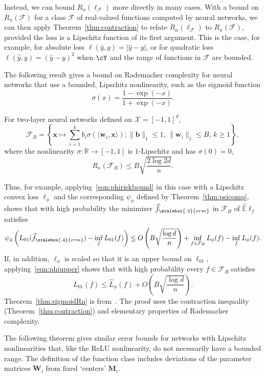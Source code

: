 Instead, we can bound $R_n(\ell_{{\mathcal F}})$ more directly in many cases. With a bound on $R_n({\mathcal F})$ for a class ${\mathcal F}$ of real-valued functions computed by neural networks, we can then apply Theorem~\ref{thm:contraction} to relate $R_n(\ell_{{\mathcal F}})$ to $R_n({\mathcal F})$, provided the loss is a Lipschitz function of its first argument.  This is the case, for example, for absolute loss $\ell(\widehat y,y)=|\widehat y-y|$, or for quadratic loss $\ell(\widehat y,y)=(\widehat y-y)^2$ when $\cY$ and the range of functions  in ${\mathcal F}$ are bounded.

The following result gives a bound on Rademacher complexity for neural networks that use a bounded, Lipschitz nonlinearity, such as the sigmoid function
  \[
    \sigma(x) = \frac{1-\exp(-x)}{1+\exp(-x)}.
  \]

\begin{theorem}\label{thm:sigmoidRn}
For two-layer neural networks defined on ${\mathcal X}=[-1,1]^d$,
  \[
    {\mathcal F}_B = \left\{{\boldsymbol x}\mapsto \sum_{i=1}^k
        b_i\sigma\left(\langle {\boldsymbol w}_i,{\boldsymbol x}\rangle\right)
        : \|{\boldsymbol b}\|_1\le 1, \,
        \|{\boldsymbol w}_i\|_1\le B,\, k\ge 1 \right\},
  \]
where the nonlinearity $\sigma:{\mathbb R}\to[-1,1]$ is $1$-Lipschitz and has
$\sigma(0)=0$,
  \[
    R_n({\mathcal F}_B) \le B \sqrt{\frac{2\log 2d}{n}}.
  \]
\end{theorem}

Thus, for example, applying~\eqref{eqn:phiriskbound} in this case with a Lipschitz convex loss $\ell_\phi$ and the corresponding
$\psi_\phi$ defined by Theorem~\ref{thm:psicomp}, shows that with high probability the minimizer $\widehat{f}_{\scalebox{.4}{erm}}$ in ${\mathcal F}_B$ of
$\widehat{\mathbb E}\ell_{f}$ satisfies
  \[
    \psi_\phi\left(L_{01}(\widehat{f}_{\scalebox{.4}{erm}})-\inf_fL_{01}(f)\right)
      \le O\left(B \sqrt{\frac{\log d}{n}}\right) +
      \inf_{f\in  {\mathcal F}_B}L_{\phi}(f)-\inf_fL_{\phi}(f).
  \]
If, in addition, $\ell_\phi$ is scaled so that it is an upper bound on
$\ell_{01}$, applying~\eqref{eqn:phiupper} shows that with high probability every $f\in {\mathcal F}_B$ satisfies
  \[
    L_{01}(f) \le  \widehat L_{\phi}(f)
            + O\left(B\sqrt{\frac{\log d}{n}}\right).
  \]
Theorem~\ref{thm:sigmoidRn} is from~\cite{bm-rgcrbsr-02}. The proof uses the contraction inequality (Theorem~\ref{thm:contraction})
and elementary properties of Rademacher complexity.

The following theorem gives similar error bounds for networks with Lipschitz nonlinearities that, like the ReLU nonlinearity, do not necessarily have a bounded range. The definition of the function class includes deviations of the parameter matrices ${\boldsymbol W}_i$ from fixed `centers' ${\boldsymbol M}_i$.

